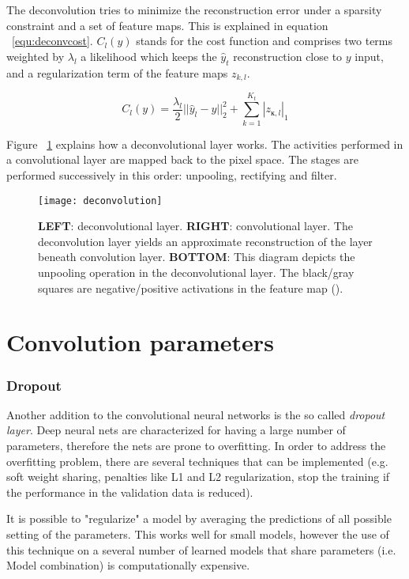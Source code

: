 The deconvolution tries to minimize the reconstruction error under a sparsity constraint and a set of feature maps. This is explained in equation ~\ref{equ:deconvcost}. $C_l(y)$ stands for the cost function and comprises two terms weighted by $\lambda_l$ a likelihood which keeps the $\hat{y}_t$ reconstruction close to $y$ input, and a regularization term of the feature maps $z_{k,l}$. 
 
\begin{equation}
 C_l(y) = \frac{\lambda_l}{2} ||\hat{y}_l-y||^2_2+\sum\limits_{k=1}^{K_t}|z_{ĸ,l}|_1
 \label{equ:deconvcost}
\end{equation}

Figure ~\ref{fig:deconv} explains how a deconvolutional layer works. The activities performed in a convolutional layer are mapped back to the pixel space. The stages are performed successively in this order: unpooling, rectifying and filter.

\begin{figure}
 \centering
 \texttt{[image: deconvolution]}
 \caption{\textbf{LEFT}: deconvolutional layer. \textbf{RIGHT}: convolutional layer. The deconvolution layer yields an approximate reconstruction of the layer beneath convolution layer.
 \textbf{BOTTOM}: This diagram depicts the unpooling operation in the deconvolutional layer. The black/gray squares are negative/positive activations in the feature map (\textcite{zeiler2014visualizing}).}
 \label{fig:deconv}
\end{figure}

\section{Convolution parameters}
\subsubsection{Dropout}
Another addition to the convolutional neural networks is the so called \textit{dropout layer}. Deep neural nets are characterized for having a large number of parameters, therefore the nets are prone to overfitting. In order to address the overfitting problem, there are several techniques that can be implemented (e.g. soft weight sharing, penalties like L1 and L2 regularization, stop the training if the performance in the validation data is reduced).

It is possible to "regularize" a model by averaging the predictions of all possible setting of the parameters. This works well for small models, however the use of this technique on a several number of learned models that share parameters (i.e. Model combination) is computationally expensive.
 

